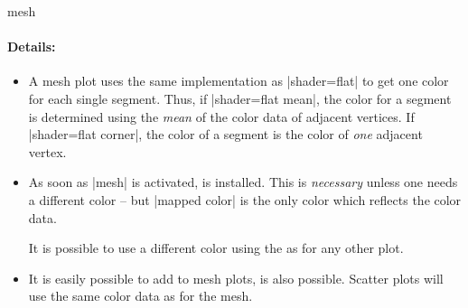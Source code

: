 \begin{plottype}{mesh}
	\paragraph{Details:}
	\begin{itemize}
		\item 
	A mesh plot uses the same implementation as |shader=flat| to get one color for each single segment. Thus, if |shader=flat mean|, the color for a segment is determined using the \emph{mean} of the color data of adjacent vertices. If |shader=flat corner|, the color of a segment is the color of \emph{one} adjacent vertex.
		\item As soon as |mesh| is activated,  is installed. This is \emph{necessary} unless one needs a different color -- but |mapped color| is the only color which reflects the color data.

		It is possible to use a different color using the  as for any other plot.

		\item It is easily possible to add  to mesh plots,  is also possible. Scatter plots will use the same color data as for the mesh.
	\end{itemize}

\pgfplotsexpensiveexample
\begin{codeexample}[]
\end{codeexample}
\end{plottype}

